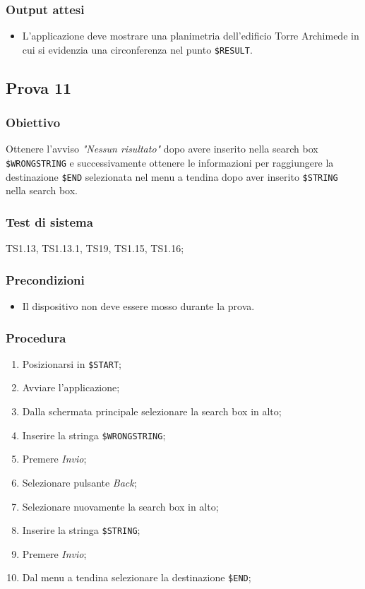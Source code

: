 \documentclass[../Sperimentazione.tex]{subfiles}
\begin{document}
	\subsubsection{Output attesi}
		\begin{itemize}
			\item L'applicazione deve mostrare una planimetria dell'edificio Torre Archimede in cui si evidenzia una circonferenza nel punto \verb|$RESULT|.
		\end{itemize}



\newpage	
\subsection{Prova 11} %
\label{subsec:Prova11}
	
	\subsubsection{Obiettivo}
		Ottenere l'avviso \textit{"Nessun risultato"} dopo avere inserito nella search box  \verb|$WRONGSTRING| e successivamente ottenere le informazioni per raggiungere la destinazione  \verb|$END| selezionata nel menu a tendina dopo aver inserito  \verb|$STRING| nella search box.
		
	\subsubsection{Test di sistema}
		TS1.13, TS1.13.1,
		TS19,
		TS1.15, TS1.16;
		
	\subsubsection{Precondizioni}
		\begin{itemize}
			\item Il dispositivo non deve essere mosso durante la prova.
		\end{itemize}
		
	\subsubsection{Procedura}
		\begin{enumerate}
		\item Posizionarsi in \verb|$START|;
		\item Avviare l'applicazione;
		\item Dalla schermata principale selezionare la search box in alto;
		\item Inserire la stringa  \verb|$WRONGSTRING|;
		\item Premere \textit{Invio};
		\item Selezionare pulsante \textit{Back};
		\item Selezionare nuovamente la search box in alto;
		\item Inserire la stringa  \verb|$STRING|;
		\item Premere \textit{Invio}; %
		\item Dal menu a tendina selezionare la destinazione  \verb|$END|;
		\end{enumerate}
		
\end{document}
